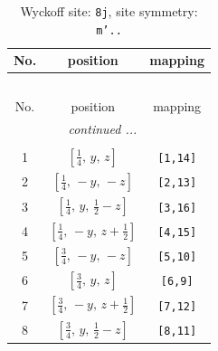 \documentclass[fleqn,8pt]{jsarticle}
\begin{document}
\begin{longtable}{ccc}
\caption{Wyckoff site: {\tt 8j}, site symmetry: {\tt m'..}}
 \\
 \hline \hline
No. & position & mapping \\ \hline \endfirsthead

\multicolumn{2}{l}{\tablename\ \thetable{}} \\
 \hline \hline
No. & position & mapping \\ \hline \endhead

 \hline \hline
\multicolumn{2}{r}{\footnotesize\it continued ...} \\ \endfoot

 \hline \hline
\multicolumn{2}{r}{} \\ \endlastfoot

1 & $\left[ \frac{1}{4},\, y,\, z \right]$ & {\tt [1,14]} \\ \hline
2 & $\left[ \frac{1}{4},\, - y,\, - z \right]$ & {\tt [2,13]} \\ \hline
3 & $\left[ \frac{1}{4},\, y,\, \frac{1}{2} - z \right]$ & {\tt [3,16]} \\ \hline
4 & $\left[ \frac{1}{4},\, - y,\, z + \frac{1}{2} \right]$ & {\tt [4,15]} \\ \hline
5 & $\left[ \frac{3}{4},\, - y,\, - z \right]$ & {\tt [5,10]} \\ \hline
6 & $\left[ \frac{3}{4},\, y,\, z \right]$ & {\tt [6,9]} \\ \hline
7 & $\left[ \frac{3}{4},\, - y,\, z + \frac{1}{2} \right]$ & {\tt [7,12]} \\ \hline
8 & $\left[ \frac{3}{4},\, y,\, \frac{1}{2} - z \right]$ & {\tt [8,11]} \\
\end{longtable}
\renewcommand{\arraystretch}{1.2}
\end{document}
